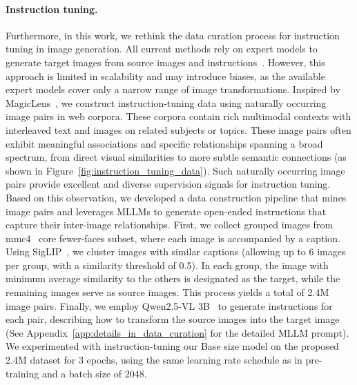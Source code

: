 \documentclass[]{fairmeta}
\begin{document}
\paragraph{Instruction tuning.}
Furthermore, in this work, we rethink the data curation process for instruction tuning in image generation. All current methods rely on expert models to generate target images from source images and instructions~\citep{seedx, Omnigen, instructimagen}. However, this approach is limited in scalability and may introduce biases, as the available expert models cover only a narrow range of image transformations. Inspired by MagicLens~\citep{Magiclens}, we construct instruction-tuning data using naturally occurring image pairs in web corpora. These corpora contain rich multimodal contexts with interleaved text and images on related subjects or topics. These image pairs often exhibit meaningful associations and specific relationships spanning a broad spectrum, from direct visual similarities to more subtle semantic connections (as shown in Figure~\ref{fig:instruction_tuning_data}). Such naturally occurring image pairs provide excellent and diverse supervision signals for instruction tuning. Based on this observation, we developed a data construction pipeline that mines image pairs and leverages MLLMs to generate open-ended instructions that capture their inter-image relationships. First, we collect grouped images from mmc4~\citep{mmc4} core fewer-faces subset, where each image is accompanied by a caption. Using SigLIP~\citep{siglip}, we cluster images with similar captions (allowing up to 6 images per group, with a similarity threshold of 0.5). In each group, the image with minimum average similarity to the others is designated as the target, while the remaining images serve as source images. This process yields a total of 2.4M image pairs. Finally, we employ Qwen2.5-VL 3B~\citep{qwen2p5vl} to generate instructions for each pair, describing how to transform the source images into the target image (See Appendix~\ref{app:details_in_data_curation} for the detailed MLLM prompt). We experimented with instruction-tuning our Base size model on the proposed 2.4M dataset for 3 epochs, using the same learning rate schedule as in pre-training and a batch size of 2048.
\end{document}
